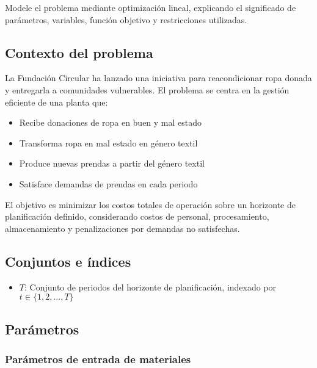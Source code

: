 \label{q:pregunta1}

Modele el problema mediante optimización lineal, explicando el significado de parámetros, variables, función objetivo y restricciones utilizadas.

\answer

\subsection*{Contexto del problema}

La Fundación Circular ha lanzado una iniciativa para reacondicionar ropa donada y entregarla a comunidades vulnerables. El problema se centra en la gestión eficiente de una planta que:

\begin{itemize}
    \item Recibe donaciones de ropa en buen y mal estado
    \item Transforma ropa en mal estado en género textil
    \item Produce nuevas prendas a partir del género textil
    \item Satisface demandas de prendas en cada periodo
\end{itemize}

El objetivo es minimizar los costos totales de operación sobre un horizonte de planificación definido, considerando costos de personal, procesamiento, almacenamiento y penalizaciones por demandas no satisfechas.

\subsection*{Conjuntos e índices}

\begin{itemize}
    \item $T$: Conjunto de periodos del horizonte de planificación, indexado por $t \in \{1,2,...,T\}$
\end{itemize}

\subsection*{Parámetros}

\subsubsection*{Parámetros de entrada de materiales}

